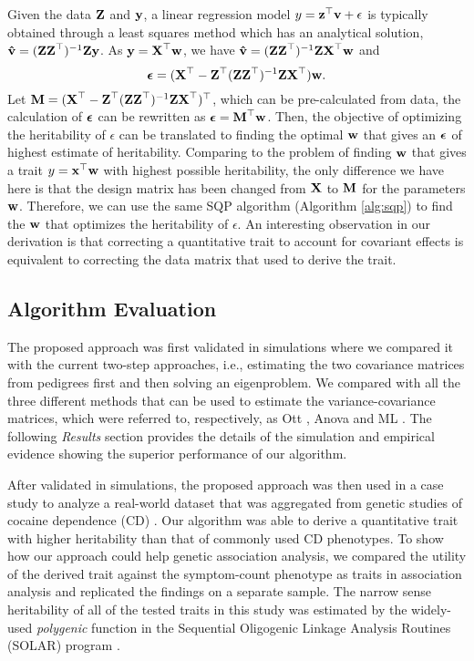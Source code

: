 \documentclass[10pt,letterpaper]{article}
\newcommand{\matrx}[1]{\ensuremath\boldsymbol{\rm #1}}
\newcommand{\vect}[1]{\ensuremath\boldsymbol{\rm #1}}
\begin{document}
Given the data $\matrx Z$ and $\vect y$, a linear regression model $y=\vect z^\top \vect v + \epsilon$ is typically obtained through a least squares method which has an analytical solution, $\vect{\hat v} = (\matrx Z \matrx Z^\top)^{-1}\matrx Z \vect y$. As $\vect y = \matrx X^\top \vect w$, we have $\vect{\hat v} = (\matrx Z \matrx Z^\top)^{-1}\matrx Z \matrx X^\top \vect w$ and 
\begin{equation*}
\vect \epsilon = (\matrx X^\top - \matrx Z^\top (\matrx Z \matrx Z^\top)^{-1}\matrx Z \matrx X^\top)\vect w.
\end{equation*}  
Let $\matrx M = (\matrx X^\top - \matrx Z^\top (\matrx Z \matrx Z^\top)^{-1}\matrx Z \matrx X^\top)^\top$, which can be pre-calculated from data, the calculation of $\vect \epsilon$ can be rewritten as $\vect \epsilon = \matrx M^\top \vect w$. Then, the objective of optimizing the heritability of $\epsilon$ can be translated to finding the optimal ${\vect w}$ that gives an $\vect \epsilon$ of highest estimate of heritability. Comparing to the problem of finding $\vect w$ that gives a trait $y = \vect x^\top \vect w$ with highest possible heritability, the only difference we have here is that the design matrix has been changed from $\matrx X$ to $\matrx M$ for the parameters $\vect w$. Therefore, we can use the same SQP algorithm (Algorithm \ref{alg:sqp}) to find the $\vect w$ that optimizes the heritability of $\epsilon$. An interesting observation in our derivation is that correcting a quantitative trait to account for covariant effects is equivalent to correcting the data matrix that used to derive the trait. 

\subsection*{Algorithm Evaluation}
The proposed approach was first validated in simulations where we compared it with the current two-step approaches, i.e., estimating the two covariance matrices from pedigrees first and then solving an eigenproblem. We compared with all the three different methods that can be used to estimate the variance-covariance matrices, which were referred to, respectively, as Ott \cite{Ott:1999:pch}, Anova \cite{pch:Oualkacha:2012} and ML \cite{mendal2013}. The following {\em Results} section provides the details of the simulation and empirical evidence showing the superior performance of our algorithm.  

After validated in simulations, the proposed approach was then used in a case study to analyze a real-world dataset that was aggregated from genetic studies of cocaine dependence (CD) \cite{Gelernter:CD:2014,Gelernter:OD:2014}. Our algorithm was able to derive a quantitative trait with higher heritability than that of commonly used CD phenotypes. To show how our approach could help genetic association analysis, we compared the utility of the derived trait against the symptom-count phenotype as traits in association analysis and replicated the findings on a separate sample. The narrow sense heritability of all of the tested traits in this study was estimated by the widely-used \textit{polygenic} function in the Sequential Oligogenic Linkage Analysis Routines (SOLAR) program \cite{almasy:1998}. 
\end{document}
